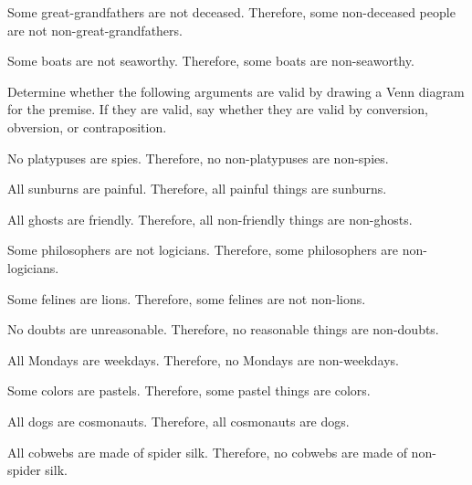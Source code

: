 \begin{exercises}
\item Some great-grandfathers are not deceased. Therefore, some non-deceased people are not non-great-grandfathers.


\item Some boats are not seaworthy. Therefore, some boats are non-seaworthy.

\end{exercises}


\noindent \problempart Determine whether the following arguments are valid by drawing a Venn diagram for the premise. If they are valid, say whether they are valid by conversion, obversion, or contraposition.

\begin{exercises}
\item No platypuses are spies. Therefore, no non-platypuses are non-spies.
\item All sunburns are painful. Therefore, all painful things are sunburns.
\item All ghosts are friendly. Therefore, all non-friendly things are non-ghosts.
\item Some philosophers are not logicians. Therefore, some philosophers are non-logicians.
\item Some felines are lions. Therefore, some felines are not non-lions.
\item No doubts are unreasonable. Therefore, no reasonable things are non-doubts.
\item All Mondays are weekdays. Therefore, no Mondays are non-weekdays.
\item Some colors are pastels. Therefore, some pastel things are colors.
\item All dogs are cosmonauts. Therefore, all cosmonauts are dogs.
\item All cobwebs are made of spider silk. 	Therefore, no cobwebs are made of non-spider silk.
\end{exercises}

